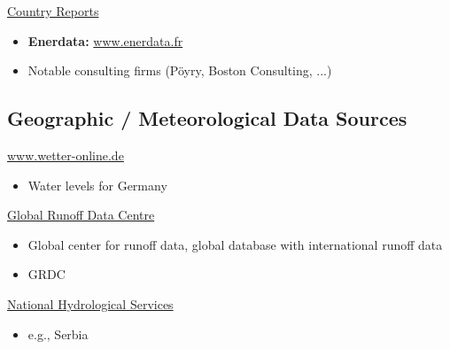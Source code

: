 \underline{Country Reports}
\begin{itemize}
    \item \textbf{Enerdata:} \url{www.enerdata.fr}
    \item Notable consulting firms (Pöyry, Boston Consulting, ...)
\end{itemize}


\subsection{Geographic / Meteorological Data Sources}
\label{sec:geographicMeteorologicalDataSources}

\underline{www.wetter-online.de}
\begin{itemize}
    \item Water levels for Germany
\end{itemize}

\underline{Global Runoff Data Centre}
\begin{itemize}
    \item Global center for runoff data, global database with international runoff data
    \item GRDC
\end{itemize}

\underline{National Hydrological Services}
\begin{itemize}
    \item e.g., Serbia
\end{itemize}